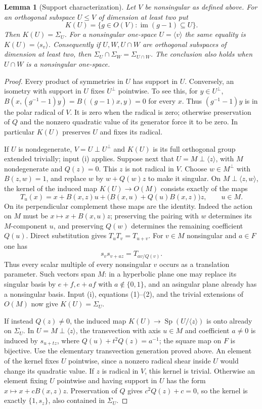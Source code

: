 \documentclass[11pt,a4paper]{article}
\newtheorem{lemma}[theorem]{Lemma}
\newcommand{\gen}[1]{\langle#1\rangle}
\newcommand{\Sp}{\operatorname{Sp}}
\begin{document}
\begin{lemma}[Support characterization]\label{support}
Let $V$ be nonsingular as defined above. For an orthogonal subspace
$U\leq V$ of dimension at least two put
\[
 K(U)=\{g\in O(V):\operatorname{im}(g-1)\subseteq U\}.
\]
Then $K(U)=\Sigma_U$. For a nonsingular one-space
$U=\gen v$ the same equality is $K(U)=\gen{s_v}$.
Consequently if $U,W,U\cap W$ are orthogonal subspaces of
dimension at least two, then
$\Sigma_U\cap\Sigma_W=\Sigma_{U\cap W}$.
The conclusion also holds when $U\cap W$ is a nonsingular one-space.
\end{lemma}
\begin{proof}
Every product of symmetries in $U$ has support in $U$.
Conversely, an isometry with support in $U$ fixes $U^\perp$
pointwise. To see this, for $y\in U^\perp$,
$B(x,(g^{-1}-1)y)=B((g-1)x,y)=0$ for every $x$.
Thus $(g^{-1}-1)y$ is in the polar radical of $V$.
It is zero when the radical is zero; otherwise preservation of $Q$
and the nonzero quadratic value of its generator force it to be zero.
In particular $K(U)$ preserves $U$ and fixes its radical.

If $U$ is nondegenerate, $V=U\perp U^\perp$ and
$K(U)$ is its full orthogonal group extended trivially; input (i)
applies. Suppose next that $U=M\perp\gen z$, with $M$
nondegenerate and $Q(z)=0$. This $z$ is not radical in $V$.
Choose $w\in M^\perp$ with $B(z,w)=1$, and replace $w$ by
$w+Q(w)z$ to make it singular. On $M\perp\gen{z,w}$,
the kernel of the induced map $K(U)\longrightarrow O(M)$ consists
exactly of the maps
\[
 T_u(x)=x+B(x,z)u+\bigl(B(x,u)+Q(u)B(x,z)\bigr)z,
 \qquad u\in M.                                      \tag{1}
\]
On its perpendicular complement these maps are the identity.
Indeed the action on $M$ must be $x\mapsto x+B(x,u)z$;
preserving the pairing with $w$ determines its $M$-component $u$,
and preserving $Q(w)$ determines the remaining coefficient $Q(u)$.
Direct substitution gives $T_uT_v=T_{u+v}$.
For $v\in M$ nonsingular and $a\in F$ one has
\[
                  s_v s_{v+az}=T_{av/Q(v)}.            \tag{2}
\]
Thus every scalar multiple of every nonsingular $v$ occurs as a
translation parameter. Such vectors span $M$: in a hyperbolic plane
one may replace its singular basis by $e+f,e+af$ with
$a\notin\{0,1\}$, and an asingular plane already has a nonsingular
basis. Input (i), equations (1)--(2), and the trivial extensions
of $O(M)$ now give $K(U)=\Sigma_U$.

If instead $Q(z)\ne0$, the induced map
$K(U)\longrightarrow\Sp(U/\gen z)$ is onto already on
$\Sigma_U$. In $U=M\perp\gen z$, the transvection with axis
$u\in M$ and coefficient $a\ne0$ is induced by
$s_{u+tz}$, where
$Q(u)+t^2Q(z)=a^{-1}$; the square map on $F$ is bijective.
Use the elementary transvection generation proved above.
An element of the kernel fixes $U$ pointwise, since a nonzero
radical shear inside $U$ would change its quadratic value.
If $z$ is radical in $V$, this kernel is trivial. Otherwise an
element fixing $U$ pointwise and having support in $U$ has the
form $x\mapsto x+cB(x,z)z$. Preservation of $Q$ gives
$c^2Q(z)+c=0$, so the kernel is exactly $\{1,s_z\}$,
also contained in $\Sigma_U$.


\end{proof}
\end{document}

